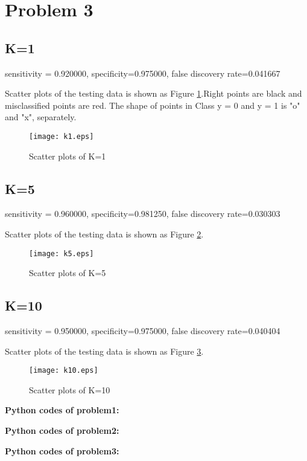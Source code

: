 \documentclass{article}
\begin{document}
\newpage
\section{Problem 3}
	\subsection{K=1}
	sensitivity = 0.920000,
	specificity=0.975000, 
	false discovery rate=0.041667 

Scatter plots of the testing data is shown as Figure \ref{fig:K=1}.Right points are black and misclassified points are red. The shape of points in Class y = 0 and y = 1 is "o" and "x", separately.
\begin{figure}[h]
    		\texttt{[image: k1.eps]}
		\centering
		\caption{Scatter plots of K=1}
		\label{fig:K=1}
    		\end{figure}	
	
	\subsection{K=5}
	sensitivity = 0.960000,
	specificity=0.981250, 
	false discovery rate=0.030303 

Scatter plots of the testing data is shown as Figure \ref{fig:K=5}.
\begin{figure}[h]
    		\texttt{[image: k5.eps]}
		\centering
		\caption{Scatter plots of K=5}
		\label{fig:K=5}
    		\end{figure}	

	\subsection{K=10}
	sensitivity = 0.950000,
	specificity=0.975000, 
	false discovery rate=0.040404

Scatter plots of the testing data is shown as Figure \ref{fig:K=10}.
\begin{figure}[!h]
    		\texttt{[image: k10.eps]}
		\centering
		\caption{Scatter plots of K=10}
		\label{fig:K=10}
    		\end{figure}
		
\newpage
\textbf{Python codes of problem1:}


\textbf{Python codes of problem2:}


\textbf{Python codes of problem3:}

\end{document}
